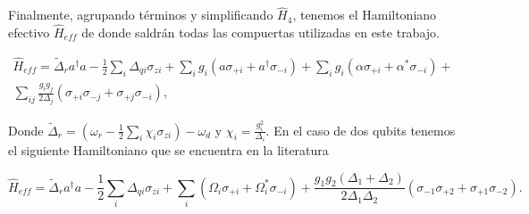 Finalmente, agrupando términos y simplificando $\hat{H}_4$, tenemos el Hamiltoniano efectivo $\hat{H}_{eff}$ de donde saldrán todas las compuertas utilizadas en este trabajo.

\begin{multline}
\hat{H}_{eff} = \tilde{\Delta}_r a^\dagger a - \frac{1}{2} \sum\limits_i \Delta_{qi} \sigma_{zi} + \sum\limits_i g_i (a \sigma_{+i} + a^\dagger \sigma_{-i}) + \sum\limits_i g_i (\alpha \sigma_{+i} + \alpha^* \sigma_{-i}) + \\
\sum\limits_{ij} \frac{g_i g_j}{2 \Delta_j} \left(\sigma_{+i} \sigma_{-j} + \sigma_{+j} \sigma_{-i}\right) ,
\end{multline}

Donde $\tilde{\Delta}_r = (\omega_r - \frac{1}{2} \sum\limits_i \chi_i \sigma_{zi}) - \omega_d$ y $\chi_i = \frac{g_i^2}{\Delta_i}$. En el caso de dos qubits tenemos el siguiente Hamiltoniano que se encuentra en la literatura \cite{blais}

\begin{equation}
    \hat{H}_{eff} = \tilde{\Delta}_r a^\dagger a - \frac{1}{2} \sum\limits_i \Delta_{qi} \sigma_{zi} + \sum\limits_i (\Omega_i \sigma_{+i} + \Omega_i^* \sigma_{-i})
+ \frac{g_1 g_2 (\Delta_1 + \Delta_2)}{2 \Delta_1 \Delta_2} (\sigma_{-1} \sigma_{+2}+\sigma_{+1} \sigma_{-2}) .
\end{equation}

